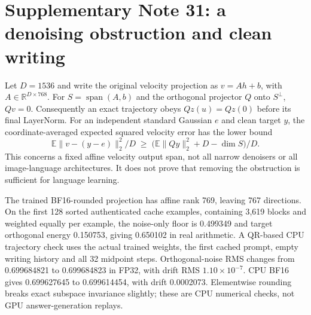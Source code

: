 \documentclass[10pt,a4paper]{article}
\begin{document}

\section*{Supplementary Note 31: a denoising obstruction and clean writing}
Let $D=1536$ and write the original velocity projection as $v=Ah+b$, with
$A\in\mathbb R^{D\times768}$. For $S=\operatorname{span}(A,b)$ and the
orthogonal projector $Q$ onto $S^\perp$, $Qv=0$. Consequently an exact
trajectory obeys $Qz(u)=Qz(0)$ before its final LayerNorm. For an independent
standard Gaussian $e$ and clean target $y$, the coordinate-averaged expected
squared velocity error has the lower bound
\begin{equation}
 \mathbb E\|v-(y-e)\|_2^2/D
 \;\geq\; \bigl(\mathbb E\|Qy\|_2^2+D-\dim S\bigr)/D.
\end{equation}
This concerns a fixed affine velocity output span, not all narrow denoisers
or all image-language architectures. It does not prove that removing the
obstruction is sufficient for language learning.

The trained BF16-rounded projection has affine rank 769, leaving 767
directions. On the first 128 sorted authenticated cache examples, containing
3,619 blocks and weighted equally per example, the noise-only floor is
0.499349 and target orthogonal energy 0.150753, giving 0.650102 in real
arithmetic. A QR-based CPU trajectory check uses the actual trained weights,
the first cached prompt, empty writing history and all 32 midpoint steps.
Orthogonal-noise RMS changes from 0.699684821 to 0.699684823 in FP32, with
drift RMS $1.10\times10^{-7}$. CPU BF16 gives 0.699627645 to 0.699614454,
with drift 0.0002073. Elementwise rounding breaks exact subspace invariance
slightly; these are CPU numerical checks, not GPU answer-generation replays.
\end{document}
